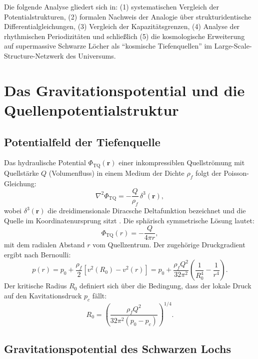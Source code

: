 ﻿\documentclass[12pt,a4paper]{report}
\begin{document}
Die folgende Analyse gliedert sich in: (1) systematischen Vergleich der Potentialstrukturen, (2) formalen Nachweis der Analogie über strukturidentische Differentialgleichungen, (3) Vergleich der Kapazitätsgrenzen, (4) Analyse der rhythmischen Periodizitäten und schließlich (5) die kosmologische Erweiterung auf supermassive Schwarze Löcher als ``kosmische Tiefenquellen'' im Large-Scale-Structure-Netzwerk des Universums.

\section{Das Gravitationspotential und die Quellenpotentialstruktur}

\subsection{Potentialfeld der Tiefenquelle}

Das hydraulische Potential $\Phi_{\mathrm{TQ}}(\mathbf{r})$ einer inkompressiblen Quellströmung mit Quellstärke $Q$ (Volumenfluss) in einem Medium der Dichte $\rho_f$ folgt der Poisson-Gleichung:
\begin{equation}
	\nabla^2 \Phi_{\mathrm{TQ}} = -\frac{Q}{\rho_f}\,\delta^3(\mathbf{r}),
	\label{eq:poisson_tq}
\end{equation}
wobei $\delta^3(\mathbf{r})$ die dreidimensionale Diracsche Deltafunktion bezeichnet und die Quelle im Koordinatenursprung sitzt \cite{lamb1932,white2011}. Die sphärisch symmetrische Lösung lautet:
\begin{equation}
	\Phi_{\mathrm{TQ}}(r) = -\frac{Q}{4\pi r},
	\label{eq:potential_tq}
\end{equation}
mit dem radialen Abstand $r$ vom Quellzentrum. Der zugehörige Druckgradient ergibt nach Bernoulli:
\begin{equation}
	p(r) = p_0 + \frac{\rho_f}{2}\left[v^2(R_0) - v^2(r)\right] = p_0 + \frac{\rho_f Q^2}{32\pi^2}\left(\frac{1}{R_0^4} - \frac{1}{r^4}\right).
	\label{eq:druck_tq}
\end{equation}
Der kritische Radius $R_0$ definiert sich über die Bedingung, dass der lokale Druck auf den Kavitationsdruck $p_c$ fällt:
\begin{equation}
	R_0 = \left(\frac{\rho_f Q^2}{32\pi^2(p_0 - p_c)}\right)^{1/4}.
	\label{eq:r0_definition}
\end{equation}

\subsection{Gravitationspotential des Schwarzen Lochs}
\end{document}
